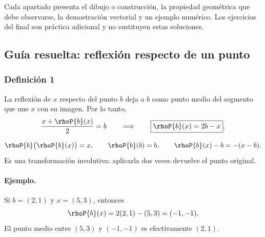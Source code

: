 \begin{idea}
Cada apartado presenta el dibujo o construcción, la propiedad geométrica que debe observarse,
la demostración vectorial y un ejemplo numérico. Los ejercicios del final son práctica
adicional y no sustituyen estas soluciones.
\end{idea}

\subsection{Guía resuelta: reflexión respecto de un punto}

\subsubsection{Definición 1}

La reflexión de \(x\) respecto del punto \(b\) deja a \(b\) como punto medio del segmento
que une \(x\) con su imagen. Por lo tanto,
\[
  \frac{x+\rhoP{b}(x)}{2}=b
  \qquad\Longrightarrow\qquad
  \boxed{\rhoP{b}(x)=2b-x}.
\]

\begin{center}
\end{center}

\begin{resultado}
\[
  \rhoP{b}\bigl(\rhoP{b}(x)\bigr)=x,
  \qquad
  \rhoP{b}(b)=b,
  \qquad
  \rhoP{b}(x)-b=-(x-b).
\]
Es una transformación involutiva: aplicarla dos veces devuelve el punto original.
\end{resultado}

\paragraph{Ejemplo.}
Si \(b=(2,1)\) y \(x=(5,3)\), entonces
\[
  \rhoP{b}(x)=2(2,1)-(5,3)=(-1,-1).
\]
El punto medio entre \((5,3)\) y \((-1,-1)\) es efectivamente \((2,1)\).

